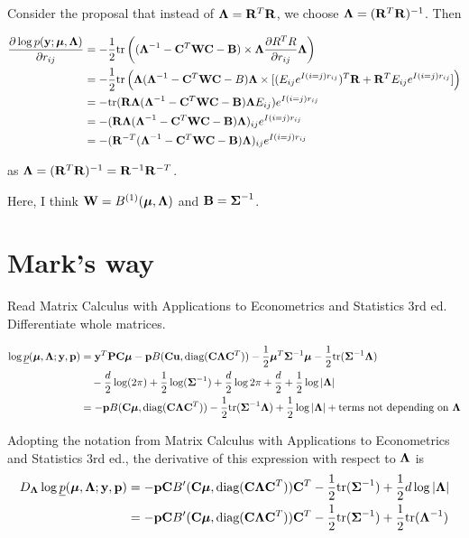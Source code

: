 \documentclass{article}[12pt]
\begin{document}
\noindent Consider the proposal that instead of $\mLambda = \mR^T \mR$, we choose
$\mLambda = (\mR^T \mR)^{-1}$. Then

\begin{align*}
	\frac{\partial \log p(\vy; \vmu, \mLambda)}{\partial r_{ij}} &= - \half \tr \left( (\mLambda^{-1} - \mC^T \mW \mC - \mB) \times \mLambda \frac{\partial R^T R}{\partial r_{ij}} \mLambda \right) \\
	&= - \half \tr \left( \mLambda(\mLambda^{-1} - \mC^T\mW\mC - B)\mLambda \times [(E_{ij} e^{I(i=j)r_{ij}})^T \mR + \mR^T E_{ij} e^{I(i=j) r_{ij}}] \right) \\
	&= - \tr (\mR \mLambda (\mLambda^{-1} - \mC^T \mW \mC - \mB) \mLambda E_{ij})e^{I(i=j) r_{ij}} \\
	&= - (\mR \mLambda (\mLambda^{-1} - \mC^T \mW \mC - \mB) \mLambda)_{ij} e^{I(i=j) r_{ij}} \\
	&= - (\mR^{-T} (\mLambda^{-1} - \mC^T \mW \mC - \mB) \mLambda)_{ij} e^{I(i=j) r_{ij}}
\end{align*}

\noindent as $\mLambda = (\mR^T \mR)^{-1} = \mR^{-1} \mR^{-T}$.

\noindent Here, I think $\mW = B^{(1)}(\vmu, \mLambda)$ and $\mB = \mSigma^{-1}$.

\section{Mark's way}

Read Matrix Calculus with Applications to Econometrics and 
Statistics 3rd ed. Differentiate whole matrices.

\begin{align*}
	\log \underline{p}(\vmu, \mLambda; \vy, \vp) &= \vy^T \mP \mC \vmu - \vp B(\mC \vu, \diag{(\mC \mLambda \mC^T)}) - \half \vmu^T \mSigma^{-1} \vmu - \half \tr{(\mSigma^{-1} \mLambda)} \\
	&\quad - \frac{d}{2} \log(2 \pi) + \half \log(\mSigma^{-1}) + \frac{d}{2} \log{2 \pi} + \frac{d}{2} + \half \log |\mLambda| \\
	&= -\vp B(\mC \vmu, \diag{(\mC \mLambda \mC^T)}) - \half \tr{(\mSigma^{-1} \mLambda)} + \half \log |\mLambda| + \text{terms not depending on $\mLambda$}
\end{align*}

\noindent Adopting the notation from Matrix Calculus with Applications to Econometrics and 
Statistics 3rd ed., the derivative of this expression with respect to $\mLambda$ is
\begin{align*}
	D_\mLambda \log \underline{p}(\vmu, \mLambda; \vy, \vp) &= -\vp \mC B'(\mC \vmu, \diag{(\mC \mLambda \mC^T)}) \mC^T - \half \tr{(\mSigma^{-1})} + \half d \log |\mLambda| \\
	 &=-\vp \mC B'(\mC \vmu, \diag{(\mC \mLambda \mC^T)}) \mC^T - \half \tr{(\mSigma^{-1})} + \half \tr{(\mLambda^{-1})}
\end{align*}
\end{document}
